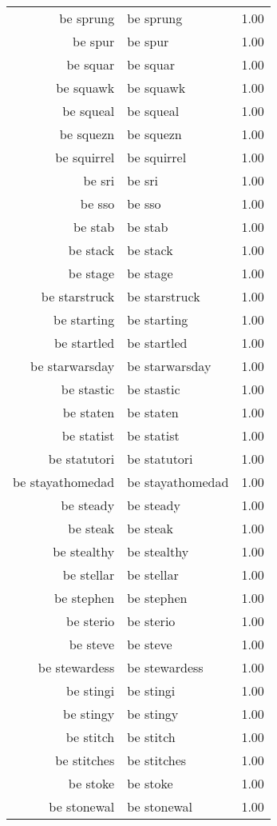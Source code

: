 \begin{table}[ht]
\begin{tabular}{rlr}
  be sprung & be sprung & 1.00 \\ 
  be spur & be spur & 1.00 \\ 
  be squar & be squar & 1.00 \\ 
  be squawk & be squawk & 1.00 \\ 
  be squeal & be squeal & 1.00 \\ 
  be squezn & be squezn & 1.00 \\ 
  be squirrel & be squirrel & 1.00 \\ 
  be sri & be sri & 1.00 \\ 
  be sso & be sso & 1.00 \\ 
  be stab & be stab & 1.00 \\ 
  be stack & be stack & 1.00 \\ 
  be stage & be stage & 1.00 \\ 
  be starstruck & be starstruck & 1.00 \\ 
  be starting & be starting & 1.00 \\ 
  be startled & be startled & 1.00 \\ 
  be starwarsday & be starwarsday & 1.00 \\ 
  be stastic & be stastic & 1.00 \\ 
  be staten & be staten & 1.00 \\ 
  be statist & be statist & 1.00 \\ 
  be statutori & be statutori & 1.00 \\ 
  be stayathomedad & be stayathomedad & 1.00 \\ 
  be steady & be steady & 1.00 \\ 
  be steak & be steak & 1.00 \\ 
  be stealthy & be stealthy & 1.00 \\ 
  be stellar & be stellar & 1.00 \\ 
  be stephen & be stephen & 1.00 \\ 
  be sterio & be sterio & 1.00 \\ 
  be steve & be steve & 1.00 \\ 
  be stewardess & be stewardess & 1.00 \\ 
  be stingi & be stingi & 1.00 \\ 
  be stingy & be stingy & 1.00 \\ 
  be stitch & be stitch & 1.00 \\ 
  be stitches & be stitches & 1.00 \\ 
  be stoke & be stoke & 1.00 \\ 
  be stonewal & be stonewal & 1.00 \\ 

\end{tabular}
\end{table}
